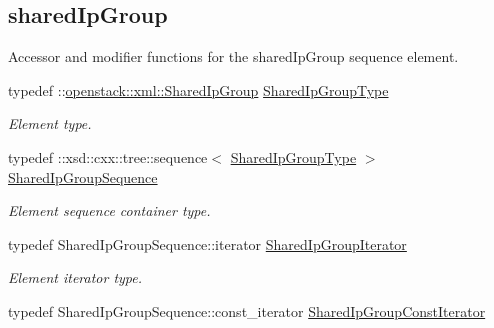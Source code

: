 \subsection*{sharedIpGroup}
\label{_amgrpa8ba349e1aa683c9f0d73763119040f8}
Accessor and modifier functions for the sharedIpGroup sequence element. \begin{DoxyCompactItemize}
\item 
\hypertarget{classopenstack_1_1xml_1_1SharedIpGroups_a90f6119486650efacc705ccd8e043a3f}{
typedef ::\hyperlink{classopenstack_1_1xml_1_1SharedIpGroup}{openstack::xml::SharedIpGroup} \hyperlink{classopenstack_1_1xml_1_1SharedIpGroups_a90f6119486650efacc705ccd8e043a3f}{SharedIpGroupType}}
\label{classopenstack_1_1xml_1_1SharedIpGroups_a90f6119486650efacc705ccd8e043a3f}

\begin{DoxyCompactList}\small\item\em Element type. \item\end{DoxyCompactList}\item 
\hypertarget{classopenstack_1_1xml_1_1SharedIpGroups_af021b83d8e3b8876b2aecc2c476e39e2}{
typedef ::xsd::cxx::tree::sequence$<$ \hyperlink{classopenstack_1_1xml_1_1SharedIpGroup}{SharedIpGroupType} $>$ \hyperlink{classopenstack_1_1xml_1_1SharedIpGroups_af021b83d8e3b8876b2aecc2c476e39e2}{SharedIpGroupSequence}}
\label{classopenstack_1_1xml_1_1SharedIpGroups_af021b83d8e3b8876b2aecc2c476e39e2}

\begin{DoxyCompactList}\small\item\em Element sequence container type. \item\end{DoxyCompactList}\item 
\hypertarget{classopenstack_1_1xml_1_1SharedIpGroups_ab5bb64011f137a315fdd6d9fb253c906}{
typedef SharedIpGroupSequence::iterator \hyperlink{classopenstack_1_1xml_1_1SharedIpGroups_ab5bb64011f137a315fdd6d9fb253c906}{SharedIpGroupIterator}}
\label{classopenstack_1_1xml_1_1SharedIpGroups_ab5bb64011f137a315fdd6d9fb253c906}

\begin{DoxyCompactList}\small\item\em Element iterator type. \item\end{DoxyCompactList}\item 
\hypertarget{classopenstack_1_1xml_1_1SharedIpGroups_a56402e4cf24eb53bac90a4a2175fe54d}{
typedef SharedIpGroupSequence::const\_\-iterator \hyperlink{classopenstack_1_1xml_1_1SharedIpGroups_a56402e4cf24eb53bac90a4a2175fe54d}{SharedIpGroupConstIterator}}
\label{classopenstack_1_1xml_1_1SharedIpGroups_a56402e4cf24eb53bac90a4a2175fe54d}


\end{DoxyCompactItemize}
